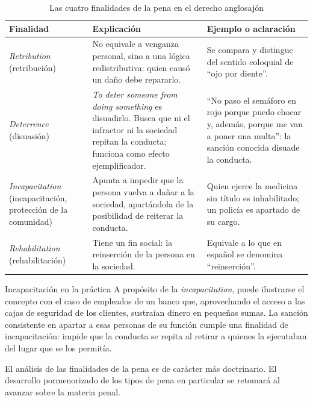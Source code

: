 \documentclass[12pt,oneside]{book}
\begin{document}
\begin{table}[H]
\centering
\caption{Las cuatro finalidades de la pena en el derecho anglosajón}
\begin{tabularx}{\textwidth}{
    >{\raggedright\arraybackslash}p{}
    >{\raggedright\arraybackslash}X
    >{\raggedright\arraybackslash}p{}
}
\toprule
\textbf{Finalidad} & \textbf{Explicación} & \textbf{Ejemplo o aclaración} \\
\midrule
\textit{Retribution} (retribución) & No equivale a venganza personal, sino a una lógica redistributiva: quien causó un daño debe repararlo. & Se compara y distingue del sentido coloquial de ``ojo por diente''. \\
\addlinespace
\textit{Deterrence} (disuasión) & \textit{To deter someone from doing something} es disuadirlo. Busca que ni el infractor ni la sociedad repitan la conducta; funciona como efecto ejemplificador. & ``No paso el semáforo en rojo porque puedo chocar y, además, porque me van a poner una multa'': la sanción conocida disuade la conducta. \\
\addlinespace
\textit{Incapacitation} (incapacitación, protección de la comunidad) & Apunta a impedir que la persona vuelva a dañar a la sociedad, apartándola de la posibilidad de reiterar la conducta. & Quien ejerce la medicina sin título es inhabilitado; un policía es apartado de su cargo. \\
\addlinespace
\textit{Rehabilitation} (rehabilitación) & Tiene un fin social: la reinserción de la persona en la sociedad. & Equivale a lo que en español se denomina ``reinserción''. \\
\bottomrule
\end{tabularx}
\end{table}

\begin{example}{Incapacitación en la práctica}
A propósito de la \textit{incapacitation}, puede ilustrarse el concepto con el caso de empleados de un banco que, aprovechando el acceso a las cajas de seguridad de los clientes, sustraían dinero en pequeñas sumas. La sanción consistente en apartar a esas personas de su función cumple una finalidad de incapacitación: impide que la conducta se repita al retirar a quienes la ejecutaban del lugar que se los permitía.
\end{example}

\begin{note}
El análisis de las finalidades de la pena es de carácter más doctrinario. El desarrollo pormenorizado de los tipos de pena en particular se retomará al avanzar sobre la materia penal.
\end{note}
\end{document}

